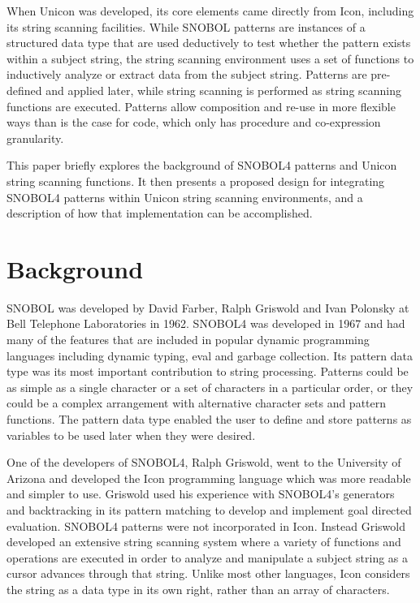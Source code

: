 \documentclass{article}
\begin{document}
When Unicon was developed, its core elements came directly from Icon, including its string scanning facilities.\cite{JefferyUnicon}  While SNOBOL patterns are instances of a structured data type that are used deductively to test whether the pattern exists within a subject string, the string scanning environment uses a set of functions to inductively analyze or extract data from the subject string.  Patterns are pre-defined and applied later, while string scanning is performed as string scanning functions are executed.  Patterns allow composition and re-use in more flexible ways than is the case for code, which only has procedure and co-expression granularity.

This paper briefly explores the background of SNOBOL4 patterns and Unicon string scanning functions.  It then presents a proposed design for integrating SNOBOL4 patterns within Unicon string scanning environments, and a description of how that implementation can be accomplished. 

\section{Background}

SNOBOL was developed by David Farber, Ralph Griswold and Ivan Polonsky at Bell Telephone Laboratories in 1962.  SNOBOL4 was developed in 1967 and had many of the features that are included in popular dynamic programming languages including dynamic typing, eval and garbage collection.  Its pattern data type was its most important contribution to string processing.  Patterns could be as simple as a single character or a set of characters in a particular order, or they could be a complex arrangement with alternative character sets and pattern functions.  The pattern data type enabled the user to define and store patterns as variables to be used later when they were desired.\cite{Snobol}  

One of the developers of SNOBOL4, Ralph Griswold, went to the University of Arizona and developed the Icon programming language which was more readable and simpler to use.\cite{JefferyUnicon}  Griswold used his experience with SNOBOL4's generators and backtracking in its pattern matching to develop and implement goal directed evaluation.\cite{Gaikaiwari2005}  SNOBOL4 patterns were not incorporated in Icon.  Instead Griswold developed an extensive string scanning system where a variety of functions and operations are executed in order to analyze and manipulate a subject string as a cursor advances through that string.  Unlike most other languages, Icon considers the string as a data type in its own right, rather than an array of characters. \cite{GriswoldIcon}  
\end{document}
